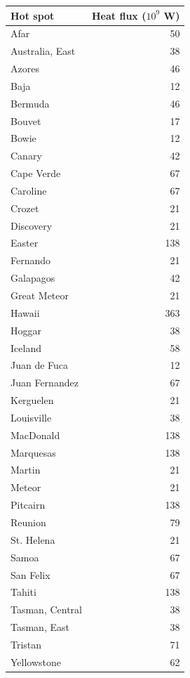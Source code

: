 \begin{tabular}{ l | r }
\hline
\hline  
Hot spot & Heat flux ($10^9$ W) \\
\hline  
Afar & 50 \\
Australia, East & 38 \\
Azores & 46 \\
Baja & 12  \\
Bermuda & 46 \\
Bouvet & 17 \\
Bowie & 12 \\
Canary & 42 \\
Cape Verde & 67 \\
Caroline & 67 \\
Crozet & 21 \\
Discovery & 21 \\
Easter & 138 \\
Fernando & 21 \\
Galapagos & 42 \\
Great Meteor & 21 \\
Hawaii & 363 \\
Hoggar & 38 \\
Iceland & 58 \\
Juan de Fuca & 12 \\
Juan Fernandez & 67 \\
Kerguelen & 21 \\
Louisville & 38 \\
MacDonald & 138 \\
Marquesas & 138 \\
Martin & 21 \\
Meteor & 21 \\
Pitcairn & 138 \\
Reunion & 79 \\
St. Helena & 21 \\
Samoa & 67 \\
San Felix & 67 \\
Tahiti & 138 \\
Tasman, Central & 38 \\
Tasman, East & 38 \\
Tristan & 71 \\
Yellowstone & 62 \\
\hline  
\hline  
\end{tabular}
